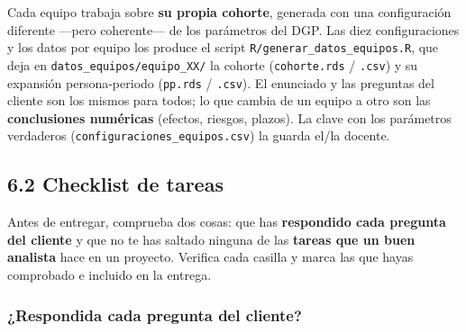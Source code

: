 \documentclass[
  letterpaper,
  DIV=11,
  numbers=noendperiod]{scrartcl}
\begin{document}
\begin{tcolorbox}[enhanced jigsaw, coltitle=black, rightrule=.15mm, arc=.35mm, leftrule=.75mm, colback=white, colbacktitle=quarto-callout-tip-color!10!white, left=2mm, breakable, toptitle=1mm, toprule=.15mm, bottomtitle=1mm, titlerule=0mm, title=\textcolor{quarto-callout-tip-color}{\faLightbulb}\hspace{0.5em}{Cada equipo, una base de datos distinta}, bottomrule=.15mm, opacityback=0, opacitybacktitle=0.6, colframe=quarto-callout-tip-color-frame]

Cada equipo trabaja sobre \textbf{su propia cohorte}, generada con una
configuración diferente ---pero coherente--- de los parámetros del DGP.
Las diez configuraciones y los datos por equipo los produce el script
\texttt{R/generar\_datos\_equipos.R}, que deja en
\texttt{datos\_equipos/equipo\_XX/} la cohorte (\texttt{cohorte.rds} /
\texttt{.csv}) y su expansión persona-periodo (\texttt{pp.rds} /
\texttt{.csv}). El enunciado y las preguntas del cliente son los mismos
para todos; lo que cambia de un equipo a otro son las
\textbf{conclusiones numéricas} (efectos, riesgos, plazos). La clave con
los parámetros verdaderos (\texttt{configuraciones\_equipos.csv}) la
guarda el/la docente.

\end{tcolorbox}

\hypertarget{sec-u16-checklist}{%
\subsection{6.2 Checklist de tareas}\label{sec-u16-checklist}}

Antes de entregar, comprueba dos cosas: que has \textbf{respondido cada
pregunta del cliente} y que no te has saltado ninguna de las
\textbf{tareas que un buen analista} hace en un proyecto. Verifica cada
casilla y marca las que hayas comprobado e incluido en la entrega.

\hypertarget{respondida-cada-pregunta-del-cliente}{%
\subsubsection{¿Respondida cada pregunta del
cliente?}\label{respondida-cada-pregunta-del-cliente}}
\end{document}
